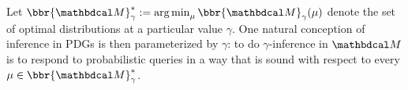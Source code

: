 \documentclass[twoside]{article}
\begin{document}
Let $\bbr{\dg M}^*_\gamma := \argmin_\mu \bbr{\dg M}_\gamma(\mu)$ denote
the set of optimal distributions at a particular value $\gamma$.
%
%
%
One natural conception of inference in PDGs is then parameterized by $\gamma$:
to do $\gamma$-inference in $\dg M$ is to respond to probabilistic queries in a way that is sound with respect to every $\mu \in \bbr{\dg M}^*_\gamma$.
\end{document}
